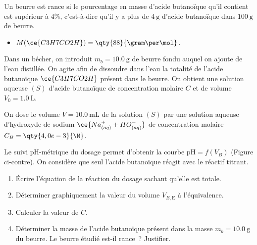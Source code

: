 Un beurre est rance si le pourcentage en masse d'acide butanoïque qu'il contient
est supérieur à $4\%$, c'est-à-dire qu'il y a plus de $\qty{4}{\gram}$ d'acide
butanoïque dans $\qty{100}{\gram}$ de beurre.

\begin{donnees}
    \begin{itemize}
        \item $M(\ce{C3H7CO2H})=\qty{88}{\gram\per\mol}$.
    \end{itemize}
\end{donnees}

Dans un bécher, on introduit $m_{b}=\qty{10,0}{\gram}$ de beurre fondu auquel on
ajoute de l'eau distillée. On agite afin de dissoudre dans l'eau la totalité de
l'acide butanoïque $\ce{C3H7CO2H}$ présent dans le beurre. On obtient une
solution aqueuse $(S)$ d'acide butanoïque de concentration molaire $C$ et de
volume $V_{0}=\qty{1,0}{\liter}$.

On dose le volume $V=\qty{10,0}{\mL}$ de la solution $(S)$ par une solution
aqueuse d'hydroxyde de sodium $\ce{Na^+_{(aq)} + HO^-_{(aq)}}$ de concentration
molaire $C_{B}=\qty{4,0e-3}{\M}$.
          
\begin{minipage}{0.57\linewidth}
    Le suivi pH-métrique du dosage permet d'obtenir la courbe
    $\mathrm{pH}=f(V_{B})$ (Figure ci-contre).  On considère que seul l'acide
    butanoïque réagit avec le réactif titrant.
    \begin{enumerate}
        \item Écrire l'équation de la réaction du dosage sachant
              qu'elle est totale.
        \item Déterminer graphiquement la valeur du volume $V_{B,\mathrm{E}}$ à
              l'équivalence.
        \item Calculer la valeur de $C$.
        \item Déterminer la masse de l'acide butanoïque présent dans
              la masse $m_{b}=\qty{10,0}{\gram}$ du beurre. Le beurre
              étudié est-il rance~? Justifier.
    \end{enumerate}
\end{minipage}
\hfill
\begin{minipage}{0.42\linewidth}
    \flushright
\end{minipage}

